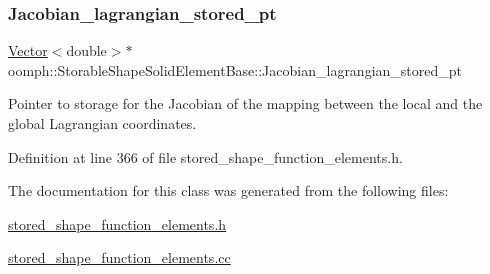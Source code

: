 \subsubsection{\texorpdfstring{Jacobian\+\_\+lagrangian\+\_\+stored\+\_\+pt}{Jacobian\_lagrangian\_stored\_pt}}
{\footnotesize\ttfamily \hyperlink{classoomph_1_1Vector}{Vector}$<$double$>$$\ast$ oomph\+::\+Storable\+Shape\+Solid\+Element\+Base\+::\+Jacobian\+\_\+lagrangian\+\_\+stored\+\_\+pt\hspace{0.3cm}{\ttfamily [private]}}



Pointer to storage for the Jacobian of the mapping between the local and the global Lagrangian coordinates. 



Definition at line 366 of file stored\+\_\+shape\+\_\+function\+\_\+elements.\+h.



The documentation for this class was generated from the following files\+:\begin{DoxyCompactItemize}
\item 
\hyperlink{stored__shape__function__elements_8h}{stored\+\_\+shape\+\_\+function\+\_\+elements.\+h}\item 
\hyperlink{stored__shape__function__elements_8cc}{stored\+\_\+shape\+\_\+function\+\_\+elements.\+cc}\end{DoxyCompactItemize}
